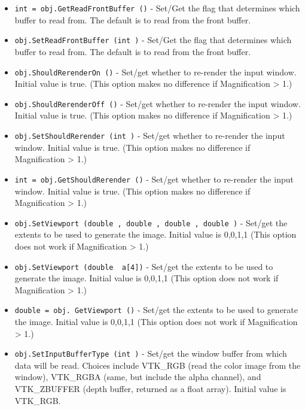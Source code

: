 \begin{itemize}
\item  \verb|int = obj.GetReadFrontBuffer ()| -  Set/Get the flag that determines which buffer to read from.
 The default is to read from the front buffer.   

\item  \verb|obj.SetReadFrontBuffer (int )| -  Set/Get the flag that determines which buffer to read from.
 The default is to read from the front buffer.   

\item  \verb|obj.ShouldRerenderOn ()| -  Set/get whether to re-render the input window. Initial value is true.
 (This option makes no difference if Magnification > 1.)

\item  \verb|obj.ShouldRerenderOff ()| -  Set/get whether to re-render the input window. Initial value is true.
 (This option makes no difference if Magnification > 1.)

\item  \verb|obj.SetShouldRerender (int )| -  Set/get whether to re-render the input window. Initial value is true.
 (This option makes no difference if Magnification > 1.)

\item  \verb|int = obj.GetShouldRerender ()| -  Set/get whether to re-render the input window. Initial value is true.
 (This option makes no difference if Magnification > 1.)

\item  \verb|obj.SetViewport (double , double , double , double )| -  Set/get the extents to be used to generate the image. Initial value is
 {0,0,1,1} (This option does not work if Magnification > 1.)

\item  \verb|obj.SetViewport (double  a[4])| -  Set/get the extents to be used to generate the image. Initial value is
 {0,0,1,1} (This option does not work if Magnification > 1.)

\item  \verb|double = obj. GetViewport ()| -  Set/get the extents to be used to generate the image. Initial value is
 {0,0,1,1} (This option does not work if Magnification > 1.)

\item  \verb|obj.SetInputBufferType (int )| -  Set/get the window buffer from which data will be read.  Choices
 include VTK\_RGB (read the color image from the window), VTK\_RGBA 
 (same, but include the alpha channel), and VTK\_ZBUFFER (depth
 buffer, returned as a float array). Initial value is VTK\_RGB.


\end{itemize}
